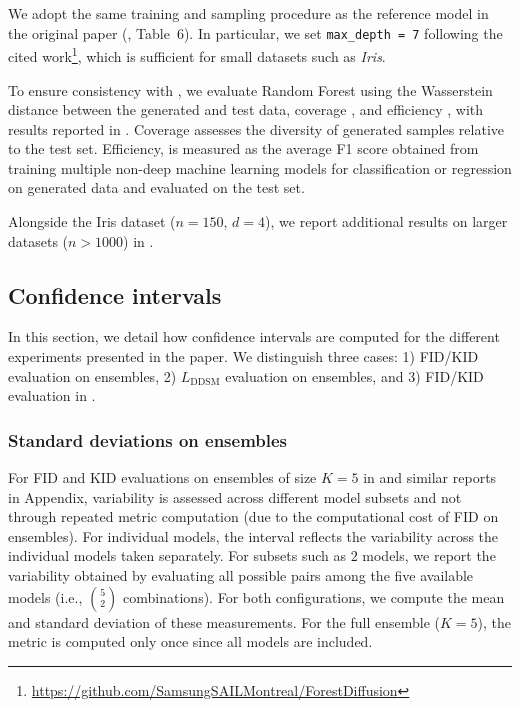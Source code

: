 \documentclass[10pt]{article} %
\newcommand{\DDSM}{\text{DDSM}}
\begin{document}
We adopt the same training and sampling procedure as the reference model in the original paper (\citealp{jolicoeur2024generating}, Table~6). 
In particular, we set \texttt{max\_depth = 7} following the cited work\footnote{\url{https://github.com/SamsungSAILMontreal/ForestDiffusion}}, 
which is sufficient for small datasets such as \textit{Iris}.


To ensure consistency with \citet{jolicoeur2024generating}, we evaluate Random Forest using the Wasserstein distance between the generated and test data, coverage \citep{naeem2020reliable}, and efficiency \citep{xu2019modeling}, with results reported in . Coverage assesses the diversity of generated samples relative to the test set. Efficiency, is measured as the average F1 score obtained from training multiple
non-deep machine learning models for classification or regression on generated data and evaluated on the test set.

Alongside the Iris dataset ($n = 150$, $d=4$), we report additional results on larger datasets ($n > 1000$) in .


\subsection{Confidence intervals}

In this section, we detail how confidence intervals are computed for the different experiments presented in the paper. We distinguish three cases: 1) FID/KID evaluation on ensembles, 2) $L_\DDSM$ evaluation on ensembles, and 3) FID/KID evaluation in .

\subsubsection{Standard deviations on ensembles}

For FID and KID evaluations on ensembles of size $K = 5$ in  and similar reports in Appendix, variability is assessed across different model subsets and not through repeated metric computation (due to the computational cost of FID on ensembles).
For individual models, the interval reflects the variability across the individual models taken separately. For subsets such as $2$ models, we report the variability obtained by evaluating all possible pairs among the five available models (i.e., $\binom{5}{2}$ combinations). For both configurations, we compute the mean and standard deviation of these measurements. 
For the full ensemble ($K=5$), the metric is computed only once since all models are included.
\end{document}
